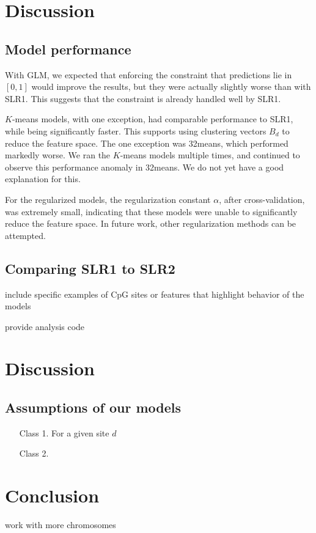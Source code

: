 \documentclass{article} %
\begin{document}
\section{Discussion}
\subsection{Model performance}
With GLM, we expected that enforcing the constraint that predictions lie in $[0,1]$ would improve the results, but they were actually slightly worse than with SLR1. This suggests that the constraint is already handled well by SLR1.

$K$-means models, with one exception, had comparable performance to SLR1, while being significantly faster. This supports using clustering vectors $B_d$ to reduce the feature space. The one exception was 32means, which performed markedly worse. We ran the $K$-means models multiple times, and continued to observe this performance anomaly in 32means. We do not yet have a good explanation for this.

For the regularized models, the regularization constant $\alpha$, after cross-validation, was extremely small, indicating that these models were unable to significantly reduce the feature space. In future work, other regularization methods can be attempted.

\subsection{Comparing SLR1 to SLR2}

include specific examples of CpG sites or features that highlight behavior of the models

provide analysis code


\section{Discussion}

\subsection{Assumptions of our models}
\begin{enumerate}
\item [Class 1.] For a given site $d$ 
\item [Class 2.]
\end{enumerate}

\section{Conclusion}
work with more chromosomes



\end{document}
